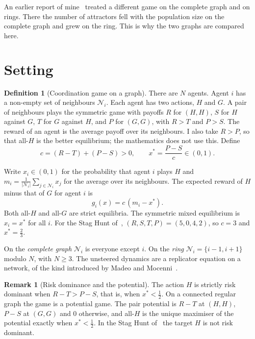 \documentclass[11pt,a4paper]{article}
\theoremstyle{definition}
\newtheorem{definition}{Definition}
\newtheorem{remark}{Remark}
\theoremstyle{plain}
\newcommand{\xs}{x^{*}}
\begin{document}
An earlier report of mine~\cite{maiti2026} treated a different game on the complete graph and on rings. There the number of attractors fell with the population size on the complete graph and grew on the ring. This is why the two graphs are compared here.

\section{Setting}\label{sec:setting}

\begin{definition}[Coordination game on a graph]\label{def:game}
There are $N$ agents. Agent $i$ has a non-empty set of neighbours $\mathcal N_i$. Each agent has two actions, $H$ and $G$. A pair of neighbours plays the symmetric game with payoffs $R$ for $(H,H)$, $S$ for $H$ against $G$, $T$ for $G$ against $H$, and $P$ for $(G,G)$, with $R>T$ and $P>S$. The reward of an agent is the average payoff over its neighbours. I also take $R>P$, so that all-$H$ is the better equilibrium; the mathematics does not use this. Define
\[
c=(R-T)+(P-S)>0,\qquad \xs=\frac{P-S}{c}\in(0,1).
\]
\end{definition}

Write $x_i\in(0,1)$ for the probability that agent $i$ plays $H$ and $m_i=\frac{1}{|\mathcal N_i|}\sum_{j\in\mathcal N_i}x_j$ for the average over its neighbours. The expected reward of $H$ minus that of $G$ for agent $i$ is
\begin{equation}\label{eq:g}
g_i(x)=c\,(m_i-\xs).
\end{equation}
Both all-$H$ and all-$G$ are strict equilibria. The symmetric mixed equilibrium is $x_i=\xs$ for all $i$. For the Stag Hunt of~\cite{huang2025}, $(R,S,T,P)=(5,0,4,2)$, so $c=3$ and $\xs=\tfrac23$.

On the \emph{complete graph} $\mathcal N_i$ is everyone except $i$. On the \emph{ring} $\mathcal N_i=\{i-1,i+1\}$ modulo $N$, with $N\ge3$. The unsteered dynamics are a replicator equation on a network, of the kind introduced by Madeo and Mocenni~\cite{madeo2015}.

\begin{remark}[Risk dominance and the potential]\label{rem:risk}
The action $H$ is strictly risk dominant when $R-T>P-S$, that is, when $\xs<\tfrac12$. On a connected regular graph the game is a potential game. The pair potential is $R-T$ at $(H,H)$, $P-S$ at $(G,G)$ and $0$ otherwise, and all-$H$ is the unique maximiser of the potential exactly when $\xs<\tfrac12$. In the Stag Hunt of~\cite{huang2025} the target $H$ is not risk dominant.
\end{remark}
\end{document}
